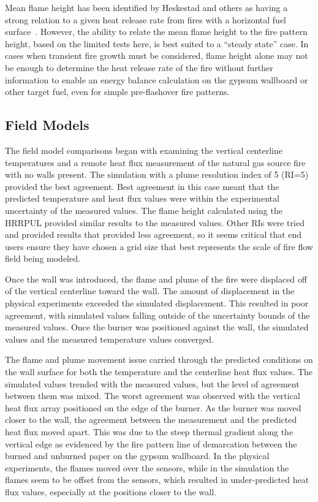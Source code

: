 \documentclass[twoside]{uocthesis}
\begin{document}
{Mean flame height has been identified by Heskestad and others as having a strong relation to a given heat release rate from fires with a horizontal fuel surface~\cite{Heskestad:SFPE, Beyler:1986}.  However, the ability to relate the mean flame height to the fire pattern height, based on the limited tests here, is best suited to a “steady state” case.  In cases when transient fire growth must be considered, flame height alone may not be enough to determine the heat release rate of the fire without further information to enable an energy balance calculation on the gypsum wallboard or other target fuel, even for simple pre-flashover fire patterns.  

\subsection{Field Models}

The field model comparisons began with examining the vertical centerline temperatures and a remote heat flux measurement of the natural gas source fire with no walls present.  The simulation with a plume resolution index of 5 (RI=5) provided the best agreement. Best agreement in this case meant that the predicted temperature and heat flux values were within the experimental uncertainty of the measured values. The flame height calculated using the HRRPUL provided similar results to the measured values.   Other RIs were tried and provided results that provided less agreement, so it seems critical that end users ensure they have chosen a grid size that best represents the scale of fire flow field being modeled.  

Once the wall was introduced, the flame and plume of the fire were displaced off of the vertical centerline toward the wall.  The amount of displacement in the physical experiments exceeded the simulated displacement.  This resulted in poor agreement, with simulated values falling outside of the uncertainty bounds of the measured values.  Once the burner was positioned against the wall, the simulated values and the measured temperature values converged.  

The flame and plume movement issue carried through the predicted conditions on the wall surface for both the temperature and the centerline heat flux values.  The simulated values trended with the measured values, but the level of agreement between them was mixed.  The worst agreement was observed with the vertical heat flux array positioned on the edge of the burner.  As the burner was moved closer to the wall, the agreement between the measurement and the predicted heat flux moved apart.  This was due to the steep thermal gradient along the vertical edge as evidenced by the fire pattern line of demarcation between the burned and unburned paper on the gypsum wallboard.  In the physical experiments, the flames moved over the sensors, while in the simulation the flames seem to be offset from the sensors, which resulted in under-predicted heat flux values, especially at the positions closer to the wall.

}
\end{document}
